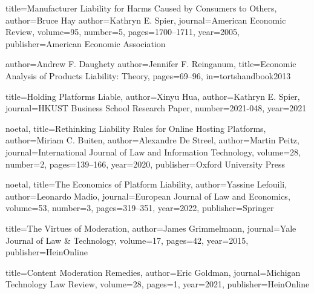 {
  title={Manufacturer Liability for Harms Caused by Consumers to Others},
  author={Bruce Hay}
  author={Kathryn E. Spier},
  journal={American Economic Review},
  volume={95},
  number={5},
  pages={1700--1711},
  year={2005},
  publisher={American Economic Association}
}


{
  author={Andrew F. Daughety}
  author={Jennifer F. Reinganum},
  title={Economic Analysis of Products Liability: Theory},
  pages={69--96},
  in={tortshandbook2013}
}



{
  title={Holding Platforms Liable},
  author={Xinyu Hua},
  author={Kathryn E. Spier},
  journal={HKUST Business School Research Paper},
  number={2021-048},
  year={2021}
}

{ noetal,
  title={Rethinking Liability Rules for Online Hosting Platforms},
  author={Miriam C. Buiten},
  author={Alexandre De Streel},
  author={Martin Peitz},
  journal={International Journal of Law and Information Technology},
  volume={28},
  number={2},
  pages={139--166},
  year={2020},
  publisher={Oxford University Press}
}

{ noetal,
  title={The Economics of Platform Liability},
  author={Yassine Lefouili},
  author={Leonardo Madio},
  journal={European Journal of Law and Economics},
  volume={53},
  number={3},
  pages={319--351},
  year={2022},
  publisher={Springer}
}



{
  title={The Virtues of Moderation},
  author={James Grimmelmann},
  journal={Yale Journal of Law \& Technology},
  volume={17},
  pages={42},
  year={2015},
  publisher={HeinOnline}
}

{
  title={Content Moderation Remedies},
  author={Eric Goldman},
  journal={Michigan Technology Law Review},
  volume={28},
  pages={1},
  year={2021},
  publisher={HeinOnline}
}

